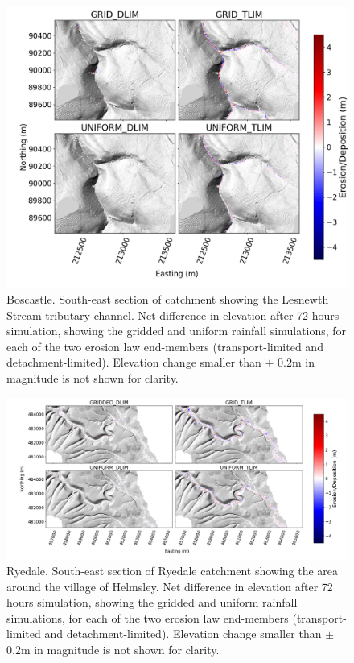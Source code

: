 \begin{figure}
\includegraphics[width=18cm]{chp06_figures_scripts/figure_boscastle_erosion_diff_ensemble_SE.png}
\caption{Boscastle. South-east section of catchment showing the Lesnewth Stream tributary channel. Net difference in elevation after 72 hours simulation, showing the gridded and uniform rainfall simulations, for each of the two erosion law end-members (transport-limited and detachment-limited). Elevation change smaller than \(\pm\) 0.2m in magnitude is not shown for clarity. }
\label{fig_boscastle_2dplan_erosion_ensemble_SE}
\end{figure}

\begin{figure}
\includegraphics[width=25cm]{chp06_figures_scripts/figure_ryedale_erosion_diff_ensemble.png}
\caption{Ryedale. South-east section of Ryedale catchment showing the area around the village of Helmsley. Net difference in elevation after 72 hours simulation, showing the gridded and uniform rainfall simulations, for each of the two erosion law end-members (transport-limited and detachment-limited). Elevation change smaller than \(\pm\) 0.2m in magnitude is not shown for clarity. }
\label{fig_ryedale_2dplan_erosion_ensemble}
\end{figure}

